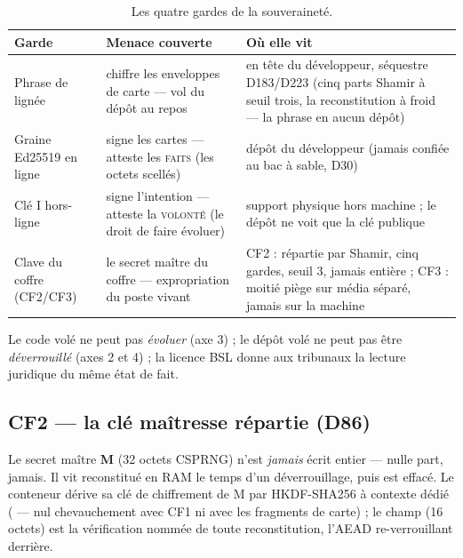 \begin{table}[htbp]
\centering\small
\caption{Les quatre gardes de la souveraineté.}
\label{tab:gardehi}
\begin{tabularx}{\textwidth}{@{}l Y Y@{}}
\toprule
\textbf{Garde} & \textbf{Menace couverte} & \textbf{Où elle vit} \\
\midrule
Phrase de lignée & chiffre les enveloppes de carte — vol du dépôt au repos & en tête
du développeur, séquestre D183/D223 (cinq parts Shamir à seuil trois, la
reconstitution à froid — la phrase en aucun dépôt) \\
Graine Ed25519 en ligne & signe les cartes — atteste les \textsc{faits} (les octets
scellés) & dépôt du développeur (jamais confiée au bac à sable, D30) \\
Clé I hors-ligne & signe l'intention — atteste la \textsc{volonté} (le droit de faire
évoluer) & support physique hors machine ; le dépôt ne voit que la clé publique \\
Clave du coffre (CF2/CF3) & le secret maître du coffre — expropriation du poste vivant &
CF2 : répartie par Shamir, cinq gardes, seuil 3, jamais entière ; CF3 : moitié piège sur
média séparé, jamais sur la machine \\
\bottomrule
\end{tabularx}
\end{table}

Le code volé ne peut pas \emph{évoluer} (axe 3) ; le dépôt volé ne peut pas être
\emph{déverrouillé} (axes 2 et 4) ; la licence BSL donne aux tribunaux la lecture
juridique du même état de fait.

\subsection{CF2 — la clé maîtresse répartie (D86)}\label{sec:cf2}

Le secret maître \textbf{M} (32 octets CSPRNG) n'est \emph{jamais} écrit entier —
nulle part, jamais. Il vit reconstitué en RAM le temps d'un déverrouillage, puis est
effacé. Le conteneur  dérive sa clé de chiffrement de M par
HKDF-SHA256 à contexte dédié ( — nul chevauchement avec CF1 ni avec les
fragments de carte) ; le champ  (16 octets) est la vérification nommée de
toute reconstitution, l'AEAD re-verrouillant derrière.

